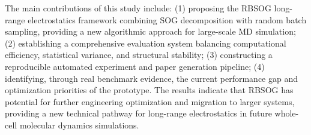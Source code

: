 The main contributions of this study include: (1) proposing the RBSOG long-range electrostatics framework combining SOG decomposition with random batch sampling, providing a new algorithmic approach for large-scale MD simulation; (2) establishing a comprehensive evaluation system balancing computational efficiency, statistical variance, and structural stability; (3) constructing a reproducible automated experiment and paper generation pipeline; (4) identifying, through real benchmark evidence, the current performance gap and optimization priorities of the prototype. The results indicate that RBSOG has potential for further engineering optimization and migration to larger systems, providing a new technical pathway for long-range electrostatics in future whole-cell molecular dynamics simulations.

